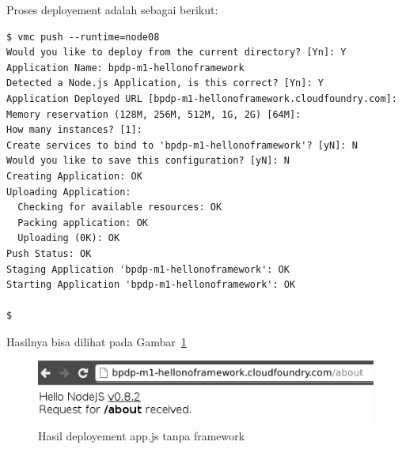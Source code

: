 Proses deployement adalah sebagai berikut:

\lstset{language=bash,caption=Deployment app.js tanpa framework}
\begin{lstlisting}
$ vmc push --runtime=node08 
Would you like to deploy from the current directory? [Yn]: Y 
Application Name: bpdp-m1-hellonoframework 
Detected a Node.js Application, is this correct? [Yn]: Y 
Application Deployed URL [bpdp-m1-hellonoframework.cloudfoundry.com]: 
Memory reservation (128M, 256M, 512M, 1G, 2G) [64M]: 
How many instances? [1]: 
Create services to bind to 'bpdp-m1-hellonoframework'? [yN]: N 
Would you like to save this configuration? [yN]: N 
Creating Application: OK 
Uploading Application: 
  Checking for available resources: OK 
  Packing application: OK 
  Uploading (0K): OK   
Push Status: OK 
Staging Application 'bpdp-m1-hellonoframework': OK                              
Starting Application 'bpdp-m1-hellonoframework': OK                             

$
\end{lstlisting}

Hasilnya bisa dilihat pada Gambar~\ref{fig:modul1-hello-no-framework}

  \begin{figure}
    \begin{center}
      \includegraphics[scale=0.5]{images/modul1-hello-no-framework}
    \end{center}
    \caption{Hasil deployement app.js tanpa framework}
    \label{fig:modul1-hello-no-framework}
  \end{figure}
